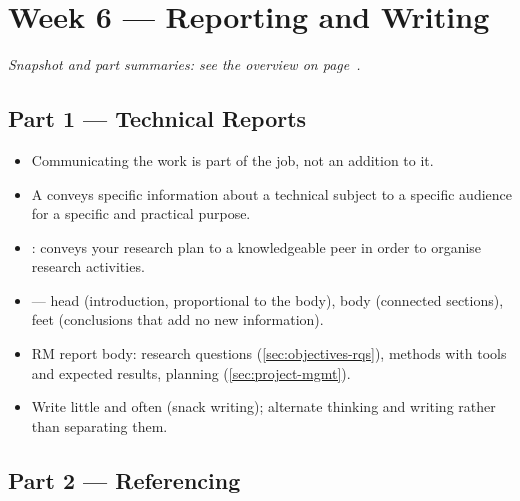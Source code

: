\documentclass[../main.tex]{subfiles}
\begin{document}
\setlength{\parskip}{3pt}

\chapter{Week 6 — Reporting and Writing}
\label{ch:week6}

\textit{Snapshot and part summaries: see the overview on page~\pageref{ov:week6}.}

\section{Part 1 — Technical Reports}
\label{sec:reports}

\begin{itemize}
  \item Communicating the work is part of the job, not an addition to it.
  \item A  conveys specific information about a technical subject to a specific audience for a specific and practical purpose.
  \item {}: conveys your research plan to a knowledgeable peer in order to organise research activities.
  \item {} — head (introduction, proportional to the body), body (connected sections), feet (conclusions that add no new information).
  \item RM report body: research questions (\autoref{sec:objectives-rqs}), methods with tools and expected results, planning (\autoref{sec:project-mgmt}).
  \item Write little and often (snack writing); alternate thinking and writing rather than separating them.
\end{itemize}

\section{Part 2 — Referencing}
\label{sec:referencing}
\end{document}
